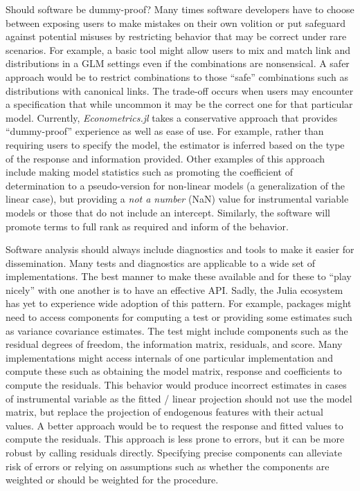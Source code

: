 \documentclass{juliacon}
\begin{document}
Should software be dummy-proof? Many times software developers have to choose between exposing users to make mistakes on their own volition or put safeguard against potential misuses by restricting behavior that may be correct under rare scenarios. For example, a basic tool might allow users to mix and match link and distributions in a GLM settings even if the combinations are nonsensical. A safer approach would be to restrict combinations to those ``safe'' combinations such as distributions with canonical links. The trade-off occurs when users may encounter a specification that while uncommon it may be the correct one for that particular model. Currently, \textit{Econometrics.jl} takes a conservative approach that provides ``dummy-proof'' experience as well as ease of use. For example, rather than requiring users to specify the model, the estimator is inferred based on the type of the response and information provided. Other examples of this approach include making model statistics such as promoting the coefficient of determination to a pseudo-version for non-linear models (a generalization of the linear case), but providing a \textit{not a number} (NaN) value for instrumental variable models or those that do not include an intercept. Similarly, the software will promote terms to full rank as required and inform of the behavior.

Software analysis should always include diagnostics and tools to make it easier for dissemination. Many tests and diagnostics are applicable to a wide set of implementations. The best manner to make these available and for these to ``play nicely'' with one another is to have an effective API. Sadly, the Julia ecosystem has yet to experience wide adoption of this pattern. For example, packages might need to access components for computing a test or providing some estimates such as variance covariance estimates. The test might include components such as the residual degrees of freedom, the information matrix, residuals, and score. Many implementations might access internals of one particular implementation and compute these such as obtaining the model matrix, response and coefficients to compute the residuals. This behavior would produce incorrect estimates in cases of instrumental variable as the fitted / linear projection should not use the model matrix, but replace the projection of endogenous features with their actual values. A better approach would be to request the response and fitted values to compute the residuals. This approach is less prone to errors, but it can be more robust by calling residuals directly. Specifying precise components can alleviate risk of errors or relying on assumptions such as whether the components are weighted or should be weighted for the procedure.
\end{document}
